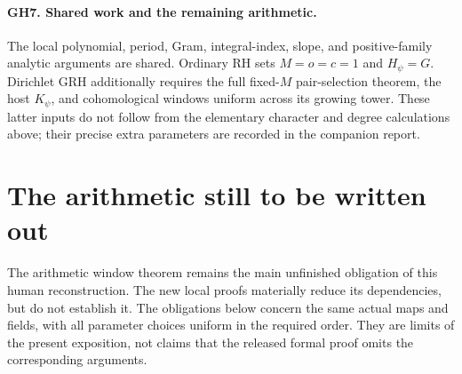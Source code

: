 \documentclass[11pt,a4paper]{article}
\numberwithin{equation}{section}
\theoremstyle{remark}\newtheorem{remark}[theorem]{Remark}
\begin{document}
\paragraph{GH7. Shared work and the remaining arithmetic.}
The local polynomial, period, Gram, integral-index, slope, and positive-family
analytic arguments are shared.  Ordinary RH sets $M=o=c=1$ and
$H_\psi=G$.  Dirichlet GRH additionally requires the full fixed-$M$
pair-selection theorem, the host $K_\psi$, and cohomological windows
uniform across its growing tower.  These latter inputs do not follow
from the elementary character and degree calculations above; their
precise extra parameters are recorded in the companion report.


\section{The arithmetic still to be written out}\label{sec:remaining}

The arithmetic window theorem remains the main unfinished obligation of this human reconstruction. The new local proofs materially reduce its dependencies, but do not establish it. The obligations below concern the same actual maps and fields, with all parameter choices uniform in the required order. They are limits of the present exposition, not claims that the released formal proof omits the corresponding arguments.
\end{document}
